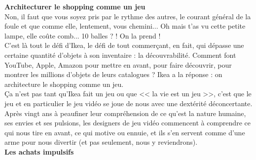 \documentclass[11pt,twoside,a4paper]{article}
\begin{document}
\textbf{\large Architecturer le shopping comme un jeu}~\\

Non, il faut que vous soyez pris par le rythme des autres, le courant g{\'e}n{\'e}ral de la foule et que comme elle, lentement, vous chemini... Oh mais t'as vu cette petite lampe, elle co{\^u}te comb... 10 balles ? ! On la prend !~\\

C'est l{\`a} tout le d{\'e}fi d'Ikea, le d{\'e}fi de tout commer\c{c}ant, en fait, qui d{\'e}passe une certaine quantit{\'e} d'objets {\`a} son inventaire : la d{\'e}couvrabilit{\'e}. Comment font YouTube, Apple, Amazon pour mettre en avant, pour faire d{\'e}couvrir, pour montrer les millions d'objets de leurs catalogues ? Ikea a la r{\'e}ponse : on architecture le shopping comme un jeu.~\\

\c{C}a n'est pas tant qu'Ikea fait un jeu ou que << la vie est un jeu >>, c'est que le jeu et en particulier le jeu vid{\'e}o se joue de nous avec une dext{\'e}rit{\'e} d{\'e}concertante. Apr{\`e}s vingt ans {\`a} peaufiner leur compr{\'e}hension de ce qu'est la nature humaine, ses envies et ses pulsions, les designers de jeu vid{\'e}o commencent {\`a} comprendre ce qui nous tire en avant, ce qui motive ou ennuie, et ils s'en servent comme d'une arme pour nous divertir (et pas seulement, nous y reviendrons).~\\

\textbf{\large Les achats impulsifs}~\\
\end{document}
